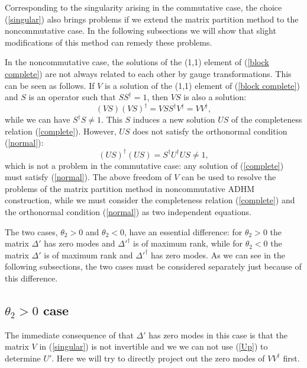 \documentclass[a4paper,a4paper]{article}
\begin{document}
Corresponding to the singularity arising in the commutative case,
the choice (\ref{singular}) also brings problems if we extend the
matrix partition method to the noncommutative case. In the
following subsections we will show that slight modifications of
this method can remedy these problems.

In the noncommutative case, the solutions of the (1,1) element of
(\ref{block complete}) are not always related to each other by
gauge transformations. This can be seen as follows.  If $V$ is a
solution of the (1,1) element of (\ref{block complete}) and $S$ is
an operator such that $SS^\dag=1$, then $VS$ is also a solution:
\begin{equation}
(VS)(VS)^\dag=VSS^\dag V^\dag=VV^\dag,
\end{equation}
while we can have $S^\dag S\ne 1$. This $S$ induces a new solution
$US$ of the completeness relation (\ref{complete}). However, $US$
does not satisfy the orthonormal condition (\ref{normal}):
\begin{equation}
(US)^\dag(US)=S^\dag U^\dag US\ne 1,
\end{equation}
which is not a problem in the commutative case: any solution of
(\ref{complete}) must satisfy (\ref{normal}). The above freedom of
$V$ can be used to resolve the problems of the matrix partition
method in noncommutative ADHM construction, while we must consider
the completeness relation (\ref{complete}) and the orthonormal
condition (\ref{normal}) as two independent equations.

The two cases, $\theta_2>0$ and $\theta_2<0$, have an essential
difference: for $\theta_2>0$ the matrix $\Delta'$ has zero modes
and $\Delta'^\dag$ is of maximum rank, while for $\theta_2<0$ the
matrix $\Delta'$ is of maximum rank and $\Delta'^\dag$ has zero
modes. As we can see in the following subsections, the two cases
must be considered separately just because of this difference.

\subsection{$\theta_2>0$ case}
The immediate consequence of that $\Delta'$ has zero modes in this
case is that the matrix $V$ in (\ref{singular}) is not invertible
and we we can not use (\ref{Up}) to determine $U'$. Here we will
try to directly project out the zero modes of $VV^\dag$ first.
\end{document}
